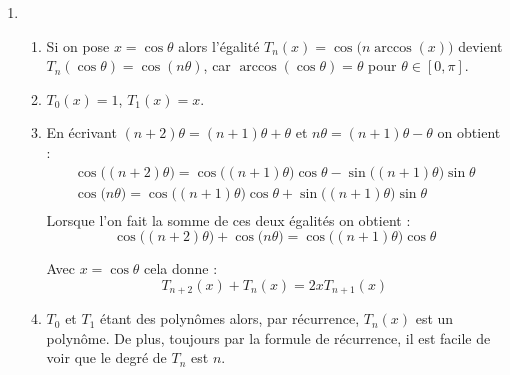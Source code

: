 \documentclass[11pt,a4paper]{article}
\renewcommand{\le}{\leqslant} \renewcommand{\leq}{\leqslant}
\begin{document}
\begin{enumerate}
  \item 
  \begin{enumerate}
    \item Si on pose $x=\cos \theta$ alors l'égalité $T_n(x)=\cos\big(n \arccos(x)\big)$
    devient $T_n(\cos\theta)=\cos(n\theta)$, car $\arccos (\cos \theta) = \theta$ pour $\theta \in [0,\pi]$.
    
    \item $T_0(x) = 1$, $T_1(x)=x$.
    
    \item En écrivant $(n+2)\theta = (n+1)\theta + \theta$ et $n\theta = (n+1)\theta - \theta$ on obtient :
    $$\begin{array}{c}
    \cos\big( (n+2)\theta \big) = \cos\big((n+1)\theta\big)\cos \theta - \sin\big((n+1)\theta\big)\sin \theta     \\
    \cos\big( n\theta \big) = \cos\big((n+1)\theta\big)\cos \theta + \sin\big((n+1)\theta\big)\sin \theta     \\    
      \end{array}$$
    Lorsque l'on fait la somme de ces deux égalités on obtient :
    $$\cos\big( (n+2)\theta \big) + \cos\big( n\theta \big) = \cos\big((n+1)\theta\big)\cos \theta$$
    
    Avec $x = \cos \theta$ cela donne :
    $$T_{n+2}(x) + T_n(x) = 2x T_{n+1}(x)$$
    
    \item $T_0$ et $T_1$ étant des polynômes alors, par récurrence,  $T_n(x)$ est un polynôme.
    De plus, toujours par la formule de récurrence, il est facile de voir que le degré de $T_n$ est $n$.
  \end{enumerate}



\end{enumerate}
\end{document}
